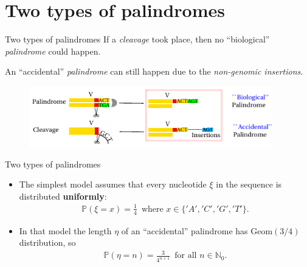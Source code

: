 \documentclass{beamer}\usepackage[]{graphicx}\usepackage[]{color}
\begin{document}
\section{Two types of palindromes}
\begin{frame}{Two types of palindromes}
  If a \textit{cleavage} took place, then no {\color{blue} ``biological''} \textit{palindrome} could happen. 
  
  \vspace{1mm}
  An {\color{blue} ``accidental''} \textit{palindrome} can still happen due to the \textit{non-genomic insertions}.
  
 \begin{figure}[h]
   \includegraphics[width=300pt]{Pictures/two_types_palindromes.pdf}
 \end{figure}
\end{frame}

\begin{frame}{Two types of palindromes}
  \begin{itemize}
    \item The simplest model assumes that every nucleotide $\xi$ in the sequence is distributed \textbf{uniformly}:
    \begin{gather*}
      \mathbb P(\xi = x) = \frac{1}{4} \, \mbox{ where } x \in \{'A', 'C', 'G','T'\}.
    \end{gather*}
    \item In that model the length $\eta$ of an ``accidental'' palindrome has $\mathrm{Geom}(3/4)$ distribution, so
    \begin{gather*}
      \mathbb P(\eta = n) = \frac{3}{4^{n+1}} \, \mbox { for all } n \in \mathbb N_0.
    \end{gather*}
  \end{itemize}
\end{frame}
\end{document}
